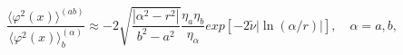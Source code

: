 \begin{equation}\label{phi2sigll12}
  \frac{\langle \varphi ^2(x)\rangle ^{(ab)}}{\langle \varphi ^2(x)
  \rangle ^{(\alpha )}_b}\approx -2\sqrt{\frac{|\alpha ^2-r^2|}{b^2-a^2}}
  \frac{\eta _a\eta _b}{\eta _{\alpha }}exp[-2\tilde \nu |\ln (\alpha
  /r)|], \quad \alpha =a,b,
\end{equation}

